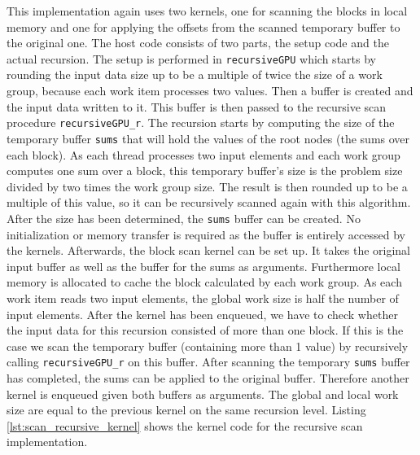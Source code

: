 This implementation again uses two kernels, one for scanning the blocks in local memory and one for applying the offsets from the scanned temporary buffer to the original one. The host code consists of two parts, the setup code and the actual recursion. The setup is performed in \lstinline!recursiveGPU! which starts by rounding the input data size up to be a multiple of twice the size of a work group, because each work item processes two values. Then a buffer is created and the input data written to it. This buffer is then passed to the recursive scan procedure \lstinline!recursiveGPU_r!. The recursion starts by computing the size of the temporary buffer \lstinline!sums! that will hold the values of the root nodes (the sums over each block). As each thread processes two input elements and each work group computes one sum over a block, this temporary buffer's size is the problem size divided by two times the work group size. The result is then rounded up to be a multiple of this value, so it can be recursively scanned again with this algorithm. After the size has been determined, the \lstinline!sums! buffer can be created. No initialization or memory transfer is required as the buffer is entirely accessed by the kernels. Afterwards, the block scan kernel can be set up. It takes the original input buffer as well as the buffer for the sums as arguments. Furthermore local memory is allocated to cache the block calculated by each work group. As each work item reads two input elements, the global work size is half the number of input elements. After the kernel has been enqueued, we have to check whether the input data for this recursion consisted of more than one block. If this is the case we scan the temporary buffer (containing more than 1 value) by recursively calling \lstinline!recursiveGPU_r! on this buffer. After scanning the temporary \lstinline!sums! buffer has completed, the sums can be applied to the original buffer. Therefore another kernel is enqueued given both buffers as arguments. The global and local work size are equal to the previous kernel on the same recursion level.
Listing \ref{lst:scan_recursive_kernel} shows the kernel code for the recursive scan implementation.



